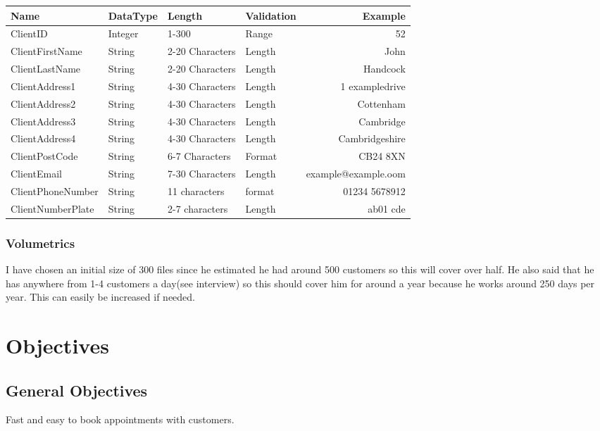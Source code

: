 \begin{tabular}{|l|p{4cm}|p{4cm}|p{4cm}|r|}
\hline
Name & DataType & Length & Validation & Example\\ \hline
ClientID & Integer & 1-300 & Range & 52 \\ \hline
ClientFirstName & String & 2-20 Characters & Length & John\\ \hline
ClientLastName & String & 2-20 Characters & Length & Handcock \\ \hline
ClientAddress1 & String & 4-30 Characters & Length & 1 exampledrive\\ \hline
ClientAddress2 & String & 4-30 Characters & Length & Cottenham\\ \hline
ClientAddress3 & String & 4-30 Characters & Length & Cambridge\\ \hline
ClientAddress4 & String & 4-30 Characters & Length & Cambridgeshire\\ \hline
ClientPostCode & String & 6-7 Characters & Format & CB24 8XN\\ \hline
ClientEmail & String & 7-30 Characters & Length & example@example.oom\\ \hline
ClientPhoneNumber & String & 11 characters & format & 01234 5678912\\ \hline
ClientNumberPlate & String & 2-7 characters & Length & ab01 cde\\ \hline
\end{tabular}

	\subsubsection{Volumetrics}

		I have chosen an initial size of 300 files since he estimated he had around 500 customers so this will cover over half. He also said that he has anywhere from 1-4 customers a day(see interview) so this should cover him for around a year because he works around 250 days per year. This can easily be increased if needed.

\section{Objectives}

	\subsection{General Objectives}
		Fast and easy to book appointments with customers.
		
